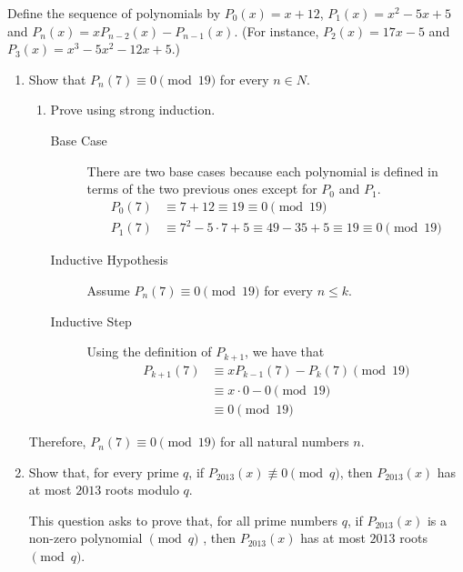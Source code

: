 \question Define the sequence of polynomials by $P_0(x) = x + 12$, 
$P_1(x) = x^2 - 5x + 5$ and $P_n(x) = xP_{n-2}(x) - P_{n-1}(x)$. 
(For instance, $P_2(x) = 17x-5$ and $P_3(x) = x^3 -5x^2 -12x+5$.) 
\begin{enumerate}[label=(\alph*)]
\item Show that $P_n(7) \equiv 0 \pmod{19}$ for every $n \in N$. 
\begin{solution}[1.5 in]

\begin{enumerate}
\item Prove using strong induction.
\begin{description}
\item[Base Case] There are two base cases because each polynomial is 
defined in terms of the two previous ones except for $P_0$ and $P_1$.
\begin{equation}
\begin{split}
P_0(7) &\equiv 7 + 12 \equiv 19 \equiv 0 \pmod{19} \\ \nonumber
P_1(7) &\equiv 7^2 - 5\cdot 7 + 5 \equiv 49 - 35 + 5 \equiv 19 \equiv 
0 \pmod{19}
\end{split}
\end{equation}
\item[Inductive Hypothesis] Assume $P_n(7) \equiv 0 \pmod{19}$ for 
every $n \leq k$.
\item [Inductive Step] Using the definition of $P_{k+1}$, we have that 
\begin{equation}
\begin{split}
P_{k+1}(7) &\equiv xP_{k-1}(7) - P_k(7) \pmod{19} \\ \nonumber
&\equiv x \cdot 0 - 0 \pmod{19} \\
&\equiv 0 \pmod{19}
\end{split}
\end{equation}
\end{description}
\end{enumerate}
Therefore, $P_n(7) \equiv 0 \pmod{19}$ for all natural numbers $n$.
\end{solution}

\item Show that, for every prime $q$, if $P_{2013}(x) \not\equiv 0 
\pmod{q}$, then $P_{2013}(x)$ has at most $2013$ roots modulo $q$. 
\begin{solution}
This question asks to prove that, for all prime numbers $q$, 
if $P_{2013}(x)$ is a non-zero polynomial $\pmod{q}$ , then $P_{2013}(x)$ 
has at most $2013$ roots $\pmod{q}$.


\end{solution}
\end{enumerate}
